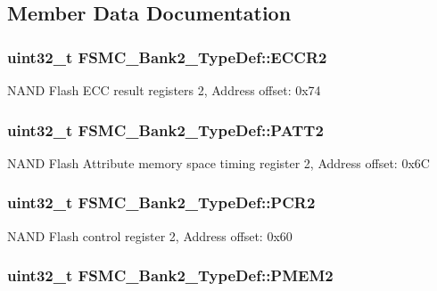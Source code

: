 \subsection{Member Data Documentation}
\hypertarget{struct_f_s_m_c___bank2___type_def_afebea17b3ac79d86ad59ce299ab5dd83}{
\subsubsection[{E\-C\-C\-R2}]{ uint32\-\_\-t F\-S\-M\-C\-\_\-\-Bank2\-\_\-\-Type\-Def\-::\-E\-C\-C\-R2}}\label{struct_f_s_m_c___bank2___type_def_afebea17b3ac79d86ad59ce299ab5dd83}
N\-A\-N\-D Flash E\-C\-C result registers 2, Address offset\-: 0x74 \hypertarget{struct_f_s_m_c___bank2___type_def_a9b2c273e4b84f24efbd731bd4ba76a84}{
\subsubsection[{P\-A\-T\-T2}]{ uint32\-\_\-t F\-S\-M\-C\-\_\-\-Bank2\-\_\-\-Type\-Def\-::\-P\-A\-T\-T2}}\label{struct_f_s_m_c___bank2___type_def_a9b2c273e4b84f24efbd731bd4ba76a84}
N\-A\-N\-D Flash Attribute memory space timing register 2, Address offset\-: 0x6\-C \hypertarget{struct_f_s_m_c___bank2___type_def_ad1eabc89a4eadb5cc6a42c1e39a39ff8}{
\subsubsection[{P\-C\-R2}]{ uint32\-\_\-t F\-S\-M\-C\-\_\-\-Bank2\-\_\-\-Type\-Def\-::\-P\-C\-R2}}\label{struct_f_s_m_c___bank2___type_def_ad1eabc89a4eadb5cc6a42c1e39a39ff8}
N\-A\-N\-D Flash control register 2, Address offset\-: 0x60 \hypertarget{struct_f_s_m_c___bank2___type_def_a29b2b75e74520e304e31c18cf9e4a7f8}{
\subsubsection[{P\-M\-E\-M2}]{ uint32\-\_\-t F\-S\-M\-C\-\_\-\-Bank2\-\_\-\-Type\-Def\-::\-P\-M\-E\-M2}}\label{struct_f_s_m_c___bank2___type_def_a29b2b75e74520e304e31c18cf9e4a7f8}
